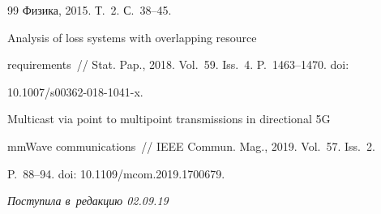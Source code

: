 {{\begin{thebibliography}{99}
Физика, 2015. Т.~2. С.~38--45.




 Analysis of loss systems with overlapping resource 


requirements~/\!\!/ Stat. Pap., 2018. Vol.~59. Iss.~4. P.~1463--1470. doi: 


10.1007\!/\!s00362-018-1041-x.




 Multicast via point to multipoint transmissions in directional 5G 


mmWave communications~/\!\!/ IEEE Commun. Mag., 2019. Vol.~57. Iss.~2.  


P.~88--94. doi: 10.1109\!/\!mcom.2019.1700679.





        \end{thebibliography}


} }








\vspace*{-3pt}





\hfill{\small\textit{Поступила в~редакцию 02.09.19}}





























\newpage





\vspace*{-28pt}










